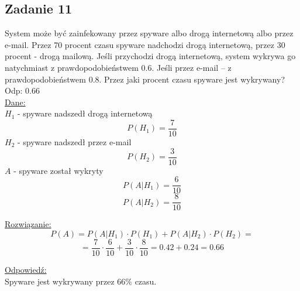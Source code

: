 \subsection{Zadanie 11}

System może być zainfekowany przez spyware albo drogą internetową albo przez e-mail. Przez 70 procent czasu spyware nadchodzi drogą internetową, przez 30 procent - drogą mailową. Jeśli przychodzi drogą internetową, system wykrywa go natychmiast z prawdopodobieństwem 0.6. Jeśli przez e-mail -- z prawdopodobieństwem 0.8. Przez jaki procent czasu spyware jest wykrywany? Odp: 0.66 \\

\underline{Dane:}
$$
$$
$H_{1}$ - spyware nadszedł drogą internetową
$$
P(H_{1}) = \frac{7}{10}
$$
$H_{2}$ - spyware  nadszedł przez e-mail
$$
P(H_{2}) = \frac{3}{10}
$$
$A$ -  spyware został wykryty
$$
P(A|H_{1}) = \frac{6}{10}
$$
$$
P(A|H_{2}) = \frac{8}{10}
$$

\underline{Rozwiązanie:}\\
$$
P(A) = P(A|H_{1}) \cdot P(H_{1}) + P(A|H_{2}) \cdot P(H_{2}) = 
$$
$$
= \frac{7}{10} \cdot  \frac{6}{10} + \frac{3}{10} \cdot \frac{8}{10} = 0.42 + 0.24 = 0.66
$$

\underline{Odpowiedź:} \\
Spyware jest wykrywany przez $66\%$ czasu.

